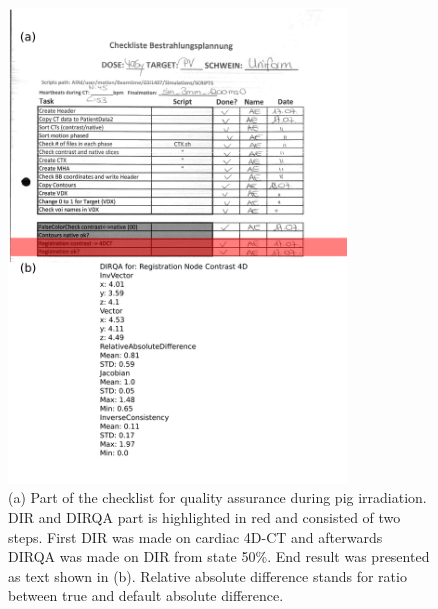 \documentclass[type=dr, dr=rernat, accentcolor=tud7b,colorbacktitle, bigchapter, openright, twoside, 12pt ]{tudthesis}
\begin{document}
\newpage
\begin{figure}[H]
	\begin{center}		
		\includegraphics[width=0.8\textwidth]{./Images/checkList.png}
		\caption{(a) Part of the checklist for quality assurance during pig irradiation. DIR and DIRQA part is highlighted in red and consisted of two steps. First DIR was made on cardiac 4D-CT and afterwards DIRQA was made on
		DIR from state 50\%. End result was presented as text shown in (b). Relative absolute difference stands for ratio between true and default absolute difference.}
		\label{checkList}
	\end{center}
\end{figure}
\newpage
\end{document}
